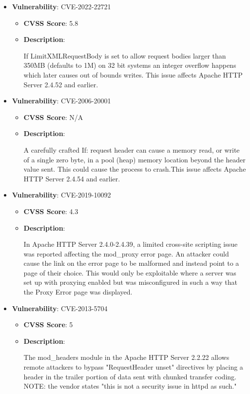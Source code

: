 \documentclass{article}
\begin{document}
\begin{itemize}
        \item \textbf{Vulnerability}: CVE-2022-22721
        \begin{itemize}
            \item \textbf{CVSS Score}:  5.8 
            \item \textbf{Description}:
            \parbox[t]{0.9\linewidth}{
                \ttfamily If LimitXMLRequestBody is set to allow request bodies larger than 350MB (defaults to 1M) on 32 bit systems an integer overflow happens which later causes out of bounds writes. This issue affects Apache HTTP Server 2.4.52 and earlier.
            }
        \end{itemize}
    
        \item \textbf{Vulnerability}: CVE-2006-20001
        \begin{itemize}
            \item \textbf{CVSS Score}:  N/A 
            \item \textbf{Description}:
            \parbox[t]{0.9\linewidth}{
                \ttfamily A carefully crafted If: request header can cause a memory read, or write of a single zero byte, in a pool (heap) memory location beyond the header value sent. This could cause the process to crash.This issue affects Apache HTTP Server 2.4.54 and earlier.
            }
        \end{itemize}
    
        \item \textbf{Vulnerability}: CVE-2019-10092
        \begin{itemize}
            \item \textbf{CVSS Score}:  4.3 
            \item \textbf{Description}:
            \parbox[t]{0.9\linewidth}{
                \ttfamily In Apache HTTP Server 2.4.0-2.4.39, a limited cross-site scripting issue was reported affecting the mod\_proxy error page. An attacker could cause the link on the error page to be malformed and instead point to a page of their choice. This would only be exploitable where a server was set up with proxying enabled but was misconfigured in such a way that the Proxy Error page was displayed.
            }
        \end{itemize}
    
        \item \textbf{Vulnerability}: CVE-2013-5704
        \begin{itemize}
            \item \textbf{CVSS Score}:  5 
            \item \textbf{Description}:
            \parbox[t]{0.9\linewidth}{
                \ttfamily The mod\_headers module in the Apache HTTP Server 2.2.22 allows remote attackers to bypass "RequestHeader unset" directives by placing a header in the trailer portion of data sent with chunked transfer coding.  NOTE: the vendor states "this is not a security issue in httpd as such."
            }
        \end{itemize}
    

\end{itemize}
\end{document}
